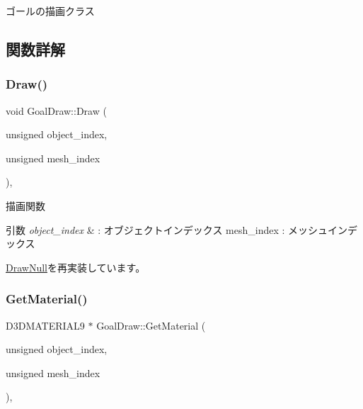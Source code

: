 ゴールの描画クラス 

\subsection{関数詳解}
\mbox{\label{class_goal_draw_a554c826d7a4534ee489dfe18edf7ee0e}} 
\subsubsection{\texorpdfstring{Draw()}{Draw()}}
{\footnotesize\ttfamily void Goal\+Draw\+::\+Draw (\begin{DoxyParamCaption}\item[{unsigned}]{object\+\_\+index,  }\item[{unsigned}]{mesh\+\_\+index }\end{DoxyParamCaption})\hspace{0.3cm}{\ttfamily [override]}, {\ttfamily [virtual]}}



描画関数 


\begin{DoxyParams}{引数}
{\em object\+\_\+index} & \+: オブジェクトインデックス mesh\+\_\+index \+: メッシュインデックス \\
\hline
\end{DoxyParams}


\mbox{\hyperlink{class_draw_null_afe50f6fd820b18d673f70f048743f339}{Draw\+Null}}を再実装しています。

\mbox{\label{class_goal_draw_a47baf72f8c1c961176610f161069b8d1}} 
\subsubsection{\texorpdfstring{Get\+Material()}{GetMaterial()}}
{\footnotesize\ttfamily D3\+D\+M\+A\+T\+E\+R\+I\+A\+L9 $\ast$ Goal\+Draw\+::\+Get\+Material (\begin{DoxyParamCaption}\item[{unsigned}]{object\+\_\+index,  }\item[{unsigned}]{mesh\+\_\+index }\end{DoxyParamCaption})\hspace{0.3cm}{\ttfamily [override]}, {\ttfamily [virtual]}}



